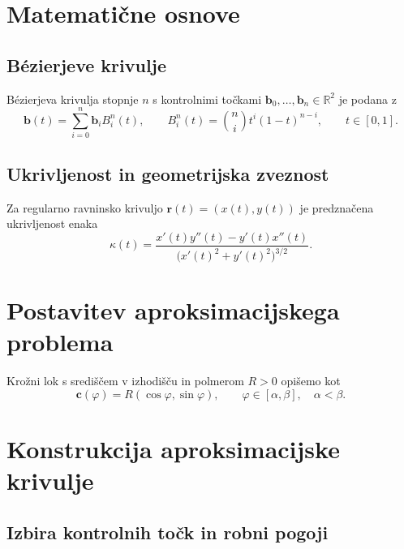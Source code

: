 \documentclass[a4paper,11pt]{article}
\theoremstyle{definition}
\theoremstyle{remark}
\begin{document}
\section{Matematične osnove}
\label{sec:osnove}

\subsection{Bézierjeve krivulje}
Bézierjeva krivulja stopnje $n$ s kontrolnimi točkami
$\mathbf{b}_0,\ldots,\mathbf{b}_n\in\mathbb{R}^2$ je podana z
\begin{equation}
  \mathbf{b}(t)=\sum_{i=0}^{n}\mathbf{b}_i B_i^n(t),
  \qquad B_i^n(t)=\binom{n}{i}t^i(1-t)^{n-i},
  \qquad t\in[0,1].
\end{equation}

\subsection{Ukrivljenost in geometrijska zveznost}
Za regularno ravninsko krivuljo $\mathbf{r}(t)=(x(t),y(t))$
je predznačena ukrivljenost enaka
\begin{equation}
  \kappa(t)=
  \frac{x'(t)y''(t)-y'(t)x''(t)}
       {\bigl(x'(t)^2+y'(t)^2\bigr)^{3/2}}.
\end{equation}

\section{Postavitev aproksimacijskega problema}
\label{sec:problem}
Krožni lok s središčem v izhodišču in polmerom $R>0$ opišemo kot
\begin{equation}
  \mathbf{c}(\varphi)=R(\cos\varphi,\sin\varphi),
  \qquad \varphi\in[\alpha,\beta],\quad \alpha<\beta.
\end{equation}

\section{Konstrukcija aproksimacijske krivulje}
\label{sec:konstrukcija}
\subsection{Izbira kontrolnih točk in robni pogoji}
\end{document}
